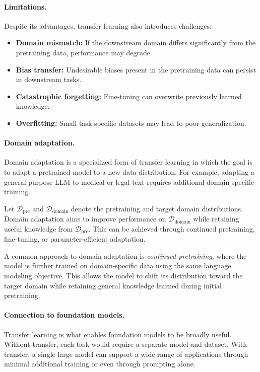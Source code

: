 \documentclass{article}
\begin{document}
\paragraph{Limitations.}
Despite its advantages, transfer learning also introduces challenges:
\begin{itemize}
    \item \textbf{Domain mismatch:} If the downstream domain differs significantly from the pretraining data, performance may degrade.
    \item \textbf{Bias transfer:} Undesirable biases present in the pretraining data can persist in downstream tasks.
    \item \textbf{Catastrophic forgetting:} Fine-tuning can overwrite previously learned knowledge.
    \item \textbf{Overfitting:} Small task-specific datasets may lead to poor generalization.
\end{itemize}

\paragraph{Domain adaptation.}
Domain adaptation is a specialized form of transfer learning in which the goal is to adapt a pretrained model to a new data distribution. For example, adapting a general-purpose LLM to medical or legal text requires additional domain-specific training.

Let $\mathcal{D}_{\text{pre}}$ and $\mathcal{D}_{\text{domain}}$ denote the pretraining and target domain distributions. Domain adaptation aims to improve performance on $\mathcal{D}_{\text{domain}}$ while retaining useful knowledge from $\mathcal{D}_{\text{pre}}$. This can be achieved through continued pretraining, fine-tuning, or parameter-efficient adaptation. 

A common approach to domain adaptation is \emph{continued pretraining}, where the model is further trained on domain-specific data using the same language modeling objective. This allows the model to shift its distribution toward the target domain while retaining general knowledge learned during initial pretraining.

\paragraph{Connection to foundation models.}
Transfer learning is what enables foundation models to be broadly useful. Without transfer, each task would require a separate model and dataset. With transfer, a single large model can support a wide range of applications through minimal additional training or even through prompting alone.
\end{document}
